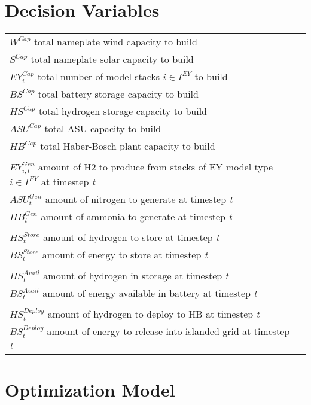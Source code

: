 \documentclass[12 pt]{article}
\begin{document}
\section*{Decision Variables}
\begin{tabular}{ll}
$W^{Cap}$ total nameplate wind capacity to build \\
$S^{Cap}$ total nameplate solar capacity to build \\
$EY^{Cap}_{i}$ total number of model stacks $i \in I^{EY}$ to build \\
$BS^{Cap}$ total battery storage capacity to build \\
$HS^{Cap}$ total hydrogen storage capacity to build \\
$ASU^{Cap}$ total ASU capacity to build\\
$HB^{Cap}$ total Haber-Bosch plant capacity to build \\
\\

$EY^{Gen}_{i,t}$ amount of H2 to produce from stacks of EY model type $i \in I^{EY}$ at timestep \textit{t} \\
$ASU^{Gen}_{t}$ amount of nitrogen to generate at timestep \textit{t} \\
$HB^{Gen}_{t}$ amount of ammonia to generate at timestep \textit{t} \\
\\
$HS^{Store}_{t}$ amount of hydrogen to store at timestep \textit{t} \\
$BS^{Store}_{t}$ amount of energy to store at timestep \textit{t} \\
\\
$HS^{Avail}_{t}$ amount of hydrogen in storage at timestep \textit{t} \\
$BS^{Avail}_{t}$ amount of energy available in battery at timestep \textit{t} \\
\\
$HS^{Deploy}_{t}$ amount of hydrogen to deploy to HB at timestep \textit{t} \\
$BS^{Deploy}_{t}$ amount of energy to release into islanded grid at timestep \textit{t} \\

\end{tabular}






\section*{Optimization Model}
\end{document}
